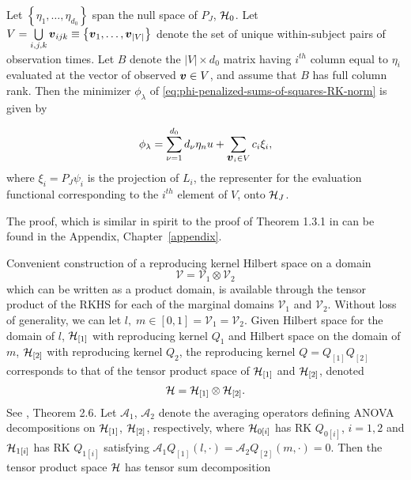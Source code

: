  \begin{theorem} \label{theorem:finite-dimensional-minimizer}
 Let $\left\{\eta_1,\dots, \eta_{d_0}\right\}$ span the null space of $P_J$, $\mathcal{H}_0$. Let  $V = \bigcup\limits_{i,j,k} \mbox{\boldmath $v$}_{ijk} \equiv \left\{ \mbox{\boldmath $v$}_1,\dots,\mbox{\boldmath $v$}_{\vert V \vert} \right\}$ denote the set of unique within-subject pairs of observation times. Let $B$ denote the $\vert V \vert \times d_0$ matrix having $i^{th}$ column equal to $\eta_i$ evaluated at the vector of observed $\mbox{\boldmath $v$} \in V$, and assume that $B$ has full column rank. Then the minimizer $\phi_\lambda$ of \ref{eq:phi-penalized-sums-of-squares-RK-norm} is given by
 
\begin{equation} \label{eq:form-of-the-minimizer-phi}
\phi_\lambda = \sum_{\nu = 1}^{d_0} d_\nu \eta_nu + \sum_{\mbox{\boldmath $v$}_i \in V} c_i \xi_i,
\end{equation}
\noindent
where $\xi_i = P_J \psi_i$ is the projection of $L_i$, the representer for the evaluation functional corresponding to the $i^{th}$ element of $V$, onto $\mathcal{H}_J$.
\end{theorem}
\vspace{0.5cm}

The proof, which is similar in spirit to the proof of Theorem 1.3.1 in \cite{wahba1990spline} can be found in the Appendix, Chapter~\ref{appendix}.

\bigskip

%

Convenient construction of a reproducing kernel Hilbert space on a domain
\[
\mathcal{V} = \mathcal{V}_1 \otimes \mathcal{V}_2
\]
\noindent
which can be written as a product domain, is available through the tensor product of the RKHS for each of the marginal domains $\mathcal{V}_1$ and $\mathcal{V}_2$. Without loss of generality, we can let $l,\;m \in \left[0,1\right] = \mathcal{V}_1 = \mathcal{V}_2$. Given Hilbert space for the domain of $l$, $\mathcal{H}_{\left[1\right]}$ with reproducing kernel $Q_1$ and Hilbert space on the domain of $m$, $\mathcal{H}_{\left[2\right]}$ with reproducing kernel $Q_2$, the reproducing kernel $Q = Q_{\left[1\right]}Q_{\left[2\right]}$ corresponds to that of the tensor product space of $\mathcal{H}_{\left[1\right]}$ and $\mathcal{H}_{\left[2\right]}$, denoted
\[
\mathcal{H} = \mathcal{H}_{\left[1\right]} \otimes \mathcal{H}_{\left[2\right]}.
\]
\noindent
See \cite{gu2002smoothing}, Theorem 2.6. Let $\mathcal{A}_1$, $\mathcal{A}_2$ denote the averaging operators defining ANOVA decompositions on $\mathcal{H}_{\left[1\right]}$, $\mathcal{H}_{\left[2\right]}$, respectively, where $\mathcal{H}_{0\left[i\right]}$ has RK $Q_{0\left[i\right]}$, $i = 1, 2$ and $\mathcal{H}_{1\left[i\right]}$ has RK $Q_{1\left[i\right]}$ satisfying $\mathcal{A}_1Q_{\left[1\right]}\left(l,\cdot\right) = \mathcal{A}_2Q_{\left[2\right]}\left(m,\cdot\right) = 0$. Then the tensor product space $\mathcal{H}$ has tensor sum decomposition

